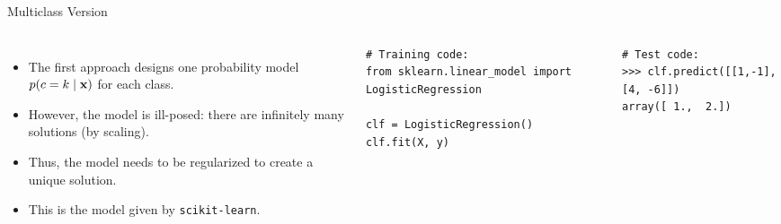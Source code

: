 \documentclass[10pt, aspectratio=169]{beamer} %
\newcommand{\x}{{\bf x}}
\begin{document}
\begin{frame}[fragile]{Multiclass Version }
\begin{columns}[onlytextwidth]
\begin{itemize}
\item The first approach designs one probability model $p(c = k\mid \x)$ for each class.
\item However, the model is ill-posed: there are infinitely many solutions (by scaling).
\item Thus, the model needs to be regularized to create a unique solution.
\item This is the model given by \texttt{scikit-learn}.
\end{itemize}
\begin{lstlisting}
# Training code:
from sklearn.linear_model import LogisticRegression

clf = LogisticRegression()
clf.fit(X, y)
\end{lstlisting}
\vspace*{-0.3cm}
\begin{columns}[onlytextwidth]
\begin{lstlisting}
# Test code:
>>> clf.predict([[1,-1], [4, -6]])
array([ 1.,  2.])


\end{lstlisting}
\end{columns}
\end{columns}
\end{frame}
\end{document}
